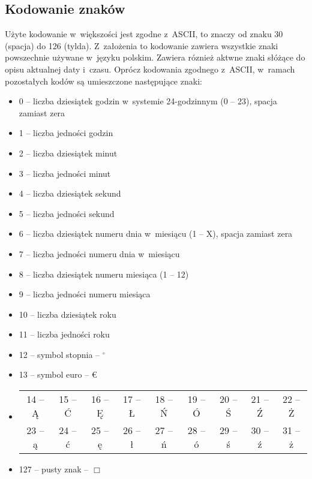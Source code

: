 \subsection{Kodowanie znaków}
Użyte kodowanie w~większości jest zgodne z~ASCII, to znaczy od znaku 30 (spacja) do 126 (tylda). Z~założenia to kodowanie zawiera wszystkie znaki powszechnie używane w~języku polskim. Zawiera róznież aktwne znaki słóżące do opisu aktualnej daty i~czasu. Oprócz kodowania zgodnego z~ASCII, w~ramach pozostałych kodów są umieszczone następujące znaki:
\begin{itemize}
\item 0 – liczba dziesiątek godzin w~systemie 24-godzinnym (0 – 23), spacja zamiast zera
\item 1 – liczba jedności godzin
\item 2 – liczba dziesiątek minut
\item 3 – liczba jedności minut
\item 4 – liczba dziesiątek sekund
\item 5 – liczba jedności sekund
\item 6 – liczba dziesiątek numeru dnia w~miesiącu (1 – X), spacja zamiast zera
\item 7 – liczba jedności numeru dnia w~miesiącu
\item 8 – liczba dziesiątek numeru miesiąca (1 – 12)
\item 9 – liczba jedności numeru miesiąca
\item 10 – liczba dziesiątek roku
\item 11 – liczba jedności roku
\item 12 – symbol stopnia – \( ^{\circ} \)
\item 13 – symbol euro – \euro
\item \begin{tabular}{ccccccccc}
14 – Ą & 15 – Ć & 16 – Ę & 17 – Ł & 18 – Ń & 19 – Ó & 20 – Ś & 21 – Ź & 22 – Ż \\
23 – ą & 24 – ć & 25 – ę & 26 – ł & 27 – ń & 28 – ó & 29 – ś & 30 – ź & 31 – ż \\
\end{tabular} 
\item 127 – pusty znak – \( \Box \)
\end{itemize}

